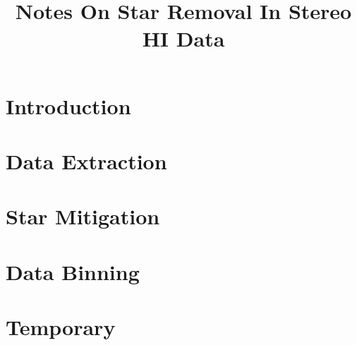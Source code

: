\documentclass[12pt, oneside]{article}
\title{Notes On Star Removal In Stereo HI Data}
\begin{document}
  \maketitle
  \newpage
  \tableofcontents
  \newpage
  
  \section{Introduction}
    
  
  \section{Data Extraction}
    
    
  \section{Star Mitigation}
    
    
  \section{Data Binning}
    
  
  \section{Temporary}
    
    
%    
%    
\end{document}
